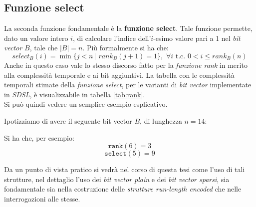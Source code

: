 \subsection{Funzione select}
La seconda funzione fondamentale è la \textbf{funzione select}. Tale funzione
permette, dato un valore intero $i$, di calcolare l'indice dell'$i$-esimo valore
pari a 1 nel \textit{bit vector} $B$, tale che $|B|=n$. Più formalmente si ha
che:
\[select_B(i)=\min\{j < n\,|\,\,rank_B(j+1)=1\},\,\,\forall i \mbox{ t.c. }
  0<i\leq rank_B(n)\]
Anche in questo caso vale lo stesso discorso fatto per la \textit{funzione rank}
in merito alla complessità temporale e ai bit aggiuntivi. La tabella con le
complessità temporali stimate della \textit{funzione select}, 
per le varianti di \textit{bit vector} implementate in \textit{SDSL}, è
visualizzabile in tabella \ref{tab:rank}.\\
Si può quindi vedere un semplice esempio esplicativo.
\begin{esempio}
  Ipotizziamo di avere il seguente bit vector $B$, di lunghezza $n=14$:
  \begin{center}
  \end{center}
  Si ha che, per esempio:
  \[\mathtt{rank}(6)=3\]
  \[\mathtt{select}(5) =9\]
\end{esempio}
Da un punto di vista pratico si vedrà nel corso di questa tesi come l'uso di
tali strutture, nel dettaglio l'uso dei \textit{bit vector plain} e dei
\textit{bit vector sparsi}, sia fondamentale sia nella costruzione delle
\textit{strutture run-length encoded} che nelle interrogazioni alle stesse.